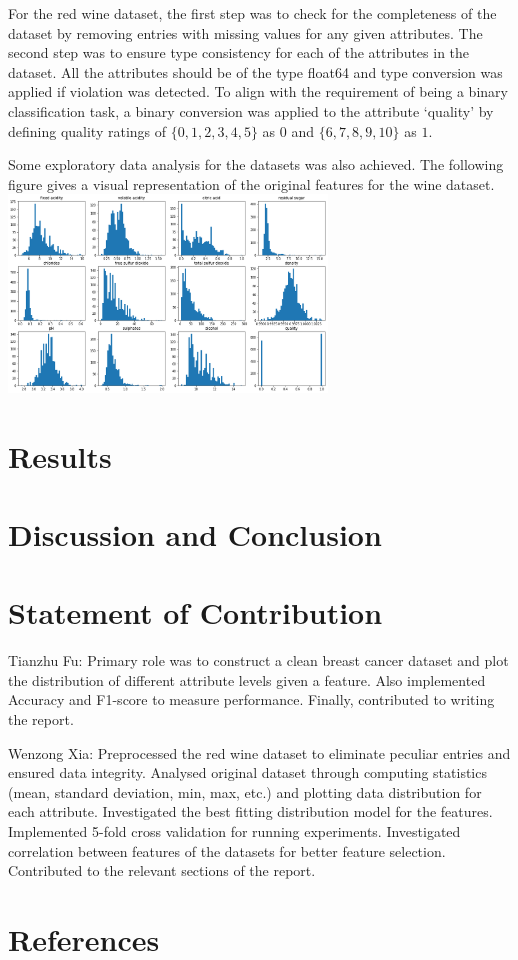\documentclass[%
 aps,
 amsmath,amssymb,
 reprint,%
 twocolumn
]{revtex4-1}
\begin{document}
For the red wine dataset, the first step was to check for the completeness of the dataset by removing entries with missing values for any given attributes. The second step was to ensure type consistency for each of the attributes in the dataset. All the attributes should be of the type float64 and type conversion was applied if violation was detected. To align with the requirement of being a binary classification task, a binary conversion was applied to the attribute ‘quality’ by defining quality ratings of $\{0,1,2,3,4,5\}$ as $0$ and $\{6,7,8,9,10\}$ as $1$. 

Some exploratory data analysis for the datasets was also achieved. The following figure gives a visual representation of the original features for the wine dataset.
\includegraphics[width=240pt]{./img/wine_distribution.png}
\section{Results}


\section{Discussion and Conclusion}

\section{\label{sec:level1}Statement of Contribution}
Tianzhu Fu: Primary role was to construct a clean breast cancer dataset and plot the distribution of different attribute levels given a feature. Also implemented Accuracy and F1-score to measure performance. Finally, contributed to writing the report. \linebreak

Wenzong Xia: Preprocessed the red wine dataset to eliminate peculiar entries and ensured data integrity. Analysed original dataset through computing statistics (mean, standard deviation, min, max, etc.) and plotting data distribution for each attribute. Investigated the best fitting distribution model for the features. Implemented 5-fold cross validation for running experiments. Investigated correlation between features of the datasets for better feature selection. Contributed to the relevant sections of the report.

\section{References}
\end{document}
